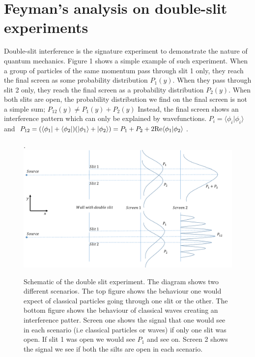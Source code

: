 \documentclass[aps,showpacs,twocolumn,floats,prd,superscriptaddress,nofootinbib]{revtex4-1}
\begin{document}
\section{Feyman's analysis on double-slit experiments}
\label{sec-DoubleSlit}

Double-slit interference is the signature experiment to demonstrate the nature of quantum mechanics. Figure 1 shows a simple example of such experiment.
When a group of particles of the same momentum pass through slit 1 only, they reach the final screen as some probability distribution $P_1(y)$. 
When they pass through slit 2 only, they reach the final screen as a probability distribution $P_2(y)$.
When both slits are open, the probability distribution we find on the final screen is not a simple sum; $P_{12}(y) \neq P_1(y) + P_2(y)$
Instead, the final screen shows an interference pattern which can only be explained by wavefunctions.
$P_i = \langle \phi_i | \phi_i \rangle$ and $P_{12} = (\langle \phi_1|+\langle \phi_2| ) (|\phi_1\rangle + | \phi_2 \rangle)=P_1 + P_2 + 2{\rm Re}\langle\phi_1|\phi_2\rangle$.

\begin{figure}[h!]
\begin{center}.
\includegraphics[scale = 0.5]{DSe.pdf}
\caption{Schematic of the double slit experiment. The diagram shows two different scenarios. The top figure shows the behaviour one would expect of classical particles going through one slit or the other. The bottom figure shows the behaviour of classical waves creating an interference patter. Screen one shows the signal that one would see in each scenario (i.e classical particles or waves) if only one slit was open. If slit 1 was open we would see $P_1$ and see on. Screen 2 shows the signal we see if both the silts are open in each scenario.}
\label{fig-doubleslit}
\end{center}
\end{figure}
\end{document}
